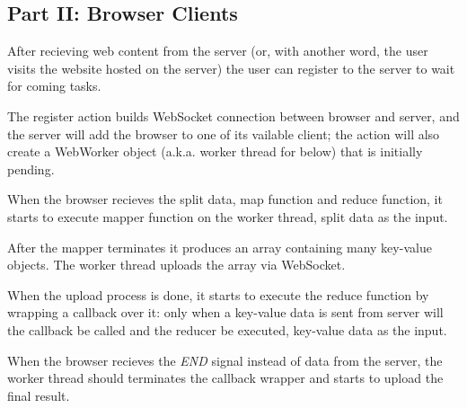 \subsection{Part II: Browser Clients}

After recieving web content from the server (or, with another word, the user visits the website hosted on the server) the user can register to the server to wait for coming tasks.

The register action builds WebSocket connection between browser and server, and the server will add the browser to one of its vailable client; the action will also create a WebWorker object (a.k.a. worker thread for below) that is initially pending.

When the browser recieves the split data, map function and reduce function, it starts to execute mapper function on the worker thread, split data as the input.

After the mapper terminates it produces an array containing many key-value objects. The worker thread uploads the array via WebSocket.

When the upload process is done, it starts to execute the reduce function by wrapping a callback over it: only when a key-value data is sent from server will the callback be called and the reducer be executed, key-value data as the input.

When the browser recieves the \emph{END} signal instead of data from the server, the worker thread should terminates the callback wrapper and starts to upload the final result.